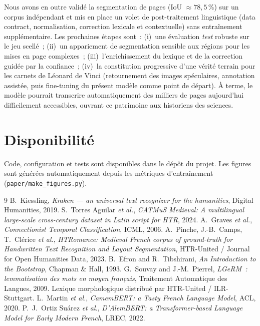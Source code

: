 \documentclass[10pt,journal,a4paper]{IEEEtran}
\begin{document}
Nous avons en outre validé la segmentation de pages (IoU $\approx 78,5\,\%$) sur
un corpus indépendant et mis en place un volet de post-traitement linguistique
(data contract, normalisation, correction lexicale et contextuelle) sans
entraînement supplémentaire. Les prochaines étapes sont~: (i)~une évaluation
\textit{test} robuste sur le jeu scellé~; (ii)~un appariement de segmentation
sensible aux régions pour les mises en page complexes~; (iii)~l'enrichissement du
lexique et de la correction guidée par la confiance~; (iv)~la constitution
progressive d'une vérité terrain pour les carnets de Léonard de Vinci
(retournement des images spéculaires, annotation assistée, puis fine-tuning du
présent modèle comme point de départ). À terme, le modèle pourrait transcrire
automatiquement des milliers de pages aujourd'hui difficilement accessibles,
ouvrant ce patrimoine aux historiens des sciences.

\section*{Disponibilité}
Code, configuration et tests sont disponibles dans le dépôt du projet. Les
figures sont générées automatiquement depuis les métriques d'entraînement
(\texttt{paper/make\_figures.py}).

\begin{thebibliography}{9}
 B.~Kiessling, \textit{Kraken --- an universal text recognizer
for the humanities}, Digital Humanities, 2019.
 S.~Torres Aguilar \textit{et al.}, \textit{CATMuS Medieval: A
multilingual large-scale cross-century dataset in Latin script for HTR}, 2024.
 A.~Graves \textit{et al.}, \textit{Connectionist Temporal
Classification}, ICML, 2006.
 A.~Pinche, J.-B.~Camps, T.~Clérice \textit{et al.},
\textit{HTRomance: Medieval French corpus of ground-truth for Handwritten Text
Recognition and Layout Segmentation}, HTR-United / Journal for Open Humanities
Data, 2023.
 B.~Efron and R.~Tibshirani, \textit{An Introduction to the
Bootstrap}, Chapman \& Hall, 1993.
 G.~Souvay and J.-M.~Pierrel, \textit{LGeRM~: lemmatisation des
mots en moyen français}, Traitement Automatique des Langues, 2009. Lexique
morphologique distribué par HTR-United / ILR-Stuttgart.
 L.~Martin \textit{et al.}, \textit{CamemBERT: a Tasty French
Language Model}, ACL, 2020.
 P.~J.~Ortiz Su\'arez \textit{et al.}, \textit{D'AlemBERT: a
Transformer-based Language Model for Early Modern French}, LREC, 2022.
\end{thebibliography}
\end{document}
